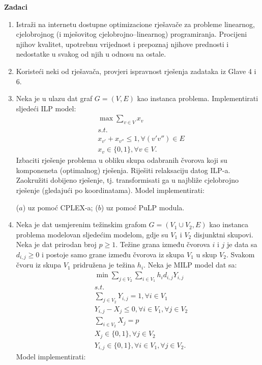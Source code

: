 \documentclass[a4paper, utf8, 11pt, colorlinks]{book}
\begin{document}
\textbf{\large Zadaci}
\begin{enumerate}
	\item Istraži na internetu dostupne optimizacione  rješavače za probleme linearnog, cjelobrojnog (i mješovitog cjelobrojno--linearnog) programiranja. Procijeni njihov kvalitet, upotrebnu vrijednost i prepoznaj njihove prednosti i nedostatke u svakog od njih u odnosu na ostale.
	
	\item Koristeći neki od rješavača, provjeri ispravnost rješenja zadataka iz Glave 4 i 6.
	
	\item Neka je u ulazu dat graf  $G = (V, E)$ kao instanca problema. Implementirati sljedeći ILP model:
	\begin{align*}
		& \max \sum_{v \in V} x_v \\
		& s.t. \\
		& x_{v'} + x_{v''} \leq 1, \forall (v' v'')\in E \\
		& x_v \in \{0, 1 \}, \forall v \in  V.
	\end{align*}
Izbaciti rješenje problema u obliku skupa odabranih čvorova koji su komponeneta (optimalnog) rješenja. Riješiti relaksaciju datog ILP-a. Zaokružiti dobijeno rješenje, tj. transformisati ga u najbliže cjelobrojno rješenje (gledajući po koordinatama).  Model implementirati:

 ($a$) uz pomoć CPLEX-a; ($b$) uz pomoć PuLP modula.
\item %
     Neka je dat usmjerenim težinskim grafom $G= (V_1 \cup V_2, E)$ kao instanca problema modelovan sljedećim modelom, gdje su $V_1$ i $V_2$ disjunktni skupovi. Neka je dat prirodan broj $p\geq 1$. Težine grana između čvorova $i$ i $j$ je data sa $d_{i,j}\geq 0 $ i postoje samo grane između čvorova iz skupa $V_1$ u skup $V_2$. Svakom čvoru iz skupa $V_1$ pridružena je težina $h_{i}$. 
     Neka je MILP model dat  sa:
     \begin{align*}
     	 &\min \sum_{j \in V_2}\sum_{i \in V_1} h_i d_{i,j} Y_{i,j} \\
     	 &s.t. \\
     	 & \sum_{j \in V_2} Y_{i, j} = 1, \forall i \in V_1 \\
     	 & Y_{i,j} - X_j \leq 0, \forall i  \in V_1, \forall j \in V_2 \\     	 
     	 & \sum_{i \in V_2} X_j  = p \\
     	 & X_j \in \{0, 1\}, \forall j \in V_2 \\
     	 & Y_{i,j} \in \{0, 1\}, \forall i \in V_1, \forall j \in V_2.
     \end{align*}
      Model implementirati:
      

\end{enumerate}
\end{document}
